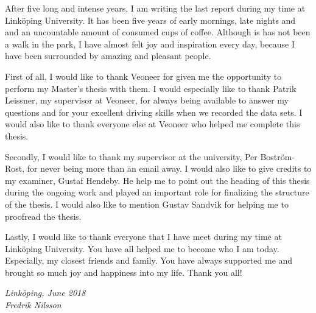 \begin{acknowledgments}
After five long and intense years, I am writing the last report during my time at Link\"oping University.
It has been five years of early mornings, late nights and and an uncountable amount of consumed cups of coffee.
Although is has not been a walk in the park, I have almost felt joy and inspiration every day, because I have been surrounded by amazing and pleasant people.

First of all, I would like to thank Veoneer for given me the opportunity to perform my Master's thesis with them.
I would especially like to thank Patrik Leissner, my supervisor at Veoneer, for always being available to answer my questions and for your excellent driving skills when we recorded the data sets.
I would also like to thank everyone else at Veoneer who helped me complete this thesis.

Secondly, I would like to thank my supervisor at the university, Per Bostr\"om-Rost, for never being more than an email away.
I would also like to give credits to my examiner, Gustaf Hendeby.
He help me to point out the heading of this thesis during the ongoing work and played an important role for finalizing the structure of the thesis.
I would also like to mention Gustav Sandvik for helping me to proofread the thesis.

Lastly, I would like to thank everyone that I have meet during my time at Link\"oping University.
You have all helped me to become who I am today.
Especially, my closest friends and family.
You have always supported me and brought so much joy and happiness into my life.
Thank you all!

  \addvspace{1em}
  \begin{flushright}
    \textit{%
      Linköping, June 2018\\
      Fredrik Nilsson%
    }
  \end{flushright}
\end{acknowledgments}
